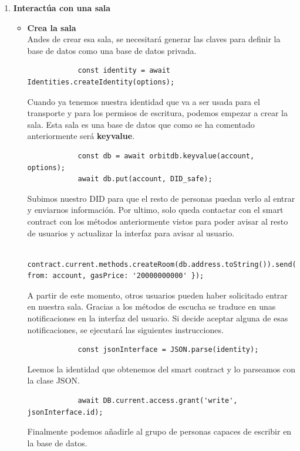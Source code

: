 \begin{enumerate}
    \item \textbf{Interactúa con una sala}\\
    \begin{itemize}
        \item \textbf{Crea la sala}\\
        Andes de crear esa sala, se necesitará generar las claves para definir la base de datos como una base de datos privada.
        \begin{lstlisting}
            const identity = await Identities.createIdentity(options);
        \end{lstlisting}
        Cuando ya tenemos nuestra identidad que va a ser usada para el transporte y para los permisos de escritura, podemos empezar a crear la sala.
        Esta sala es una base de datos que como se ha comentado anteriormente será \textbf{keyvalue}.
        \begin{lstlisting}
            const db = await orbitdb.keyvalue(account, options);
            await db.put(account, DID_safe);
        \end{lstlisting}
        Subimos nuestro DID para que el resto de personas puedan verlo al entrar y enviarnos información.
        Por ultimo, solo queda contactar con el smart contract con los métodos anteriormente vistos para poder avisar al resto de usuarios y actualizar la interfaz para avisar al usuario.
        \begin{lstlisting}
            contract.current.methods.createRoom(db.address.toString()).send({ from: account, gasPrice: '20000000000' });
        \end{lstlisting}
        A partir de este momento, otros usuarios pueden haber solicitado entrar en nuestra sala. Gracias a los métodos de escucha se traduce en unas notificaciones en la interfaz del usuario.
        Si decide aceptar alguna de esas notificaciones, se ejecutará las siguientes instrucciones.
        \begin{lstlisting}
            const jsonInterface = JSON.parse(identity);
        \end{lstlisting}
        Leemos la identidad que obtenemos del smart contract y lo parseamos con la clase JSON.
        \begin{lstlisting}
            await DB.current.access.grant('write', jsonInterface.id);
        \end{lstlisting}
        Finalmente podemos añadirle al grupo de personas capaces de escribir en la base de datos.
        \begin{lstlisting}

\end{lstlisting}
\end{itemize}
\end{enumerate}
